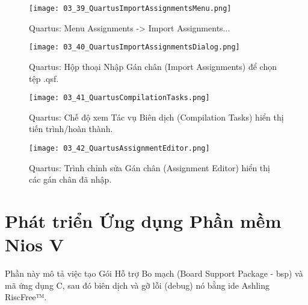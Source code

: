 \begin{figure}[htbp] \centering \texttt{[image: 03\_39\_QuartusImportAssignmentsMenu.png]} \caption{Quartus: Menu Assignments -> Import Assignments...} \label{fig:03_39} \end{figure}
\begin{figure}[htbp] \centering \texttt{[image: 03\_40\_QuartusImportAssignmentsDialog.png]} \caption{Quartus: Hộp thoại Nhập Gán chân (Import Assignments) để chọn tệp .qsf.} \label{fig:03_40} \end{figure}
\begin{figure}[htbp] \centering \texttt{[image: 03\_41\_QuartusCompilationTasks.png]} \caption{Quartus: Chế độ xem Tác vụ Biên dịch (Compilation Tasks) hiển thị tiến trình/hoàn thành.} \label{fig:03_41} \end{figure}
\begin{figure}[htbp] \centering \texttt{[image: 03\_42\_QuartusAssignmentEditor.png]} \caption{Quartus: Trình chỉnh sửa Gán chân (Assignment Editor) hiển thị các gán chân đã nhập.} \label{fig:03_42} \end{figure}

\FloatBarrier

\section{Phát triển Ứng dụng Phần mềm Nios V}
\label{sec:develop_software}

Phần này mô tả việc tạo Gói Hỗ trợ Bo mạch (Board Support Package - \acrshort{bsp}) và mã ứng dụng C, sau đó biên dịch và gỡ lỗi (debug) nó bằng \acrshort{ide} Ashling RiscFree™.

